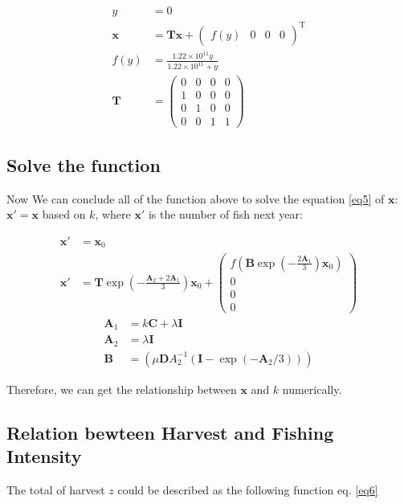 \documentclass{IEEEtran}
\begin{document}
\begin{align}
    \label{eq4}
    y &= 0\\
    \bm x &= \mathbf T \bm x +\begin{pmatrix} f(y)&0&0&0\end{pmatrix}^{\mathrm T}\\
    f(y) &= \frac{1.22\times 10 ^{11}y}{1.22\times 10 ^{11} + y}\\
    \mathbf T &= \begin{pmatrix} 0 & 0 & 0 & 0 \\ 1& 0 & 0 & 0 \\ 0 & 1 & 0 & 0 \\0 & 0 & 1 & 1 \end{pmatrix}
\end{align}

\subsection{Solve the function}

Now We can conclude all of the function above to solve the equation \ref{eq5} of $\bm x$: $\bm x' = \bm x$ based on $k$, where $\bm x'$ is the number of fish next year:  

\begin{align}
    \bm x' &= \bm x_0\\
    \label{eq5}
    \bm x' &= \mathbf T \exp(-\frac{\mathbf A_2 + 2 \mathbf A_1}{3})\bm x_0 +\begin{pmatrix} f(\mathbf B \exp(-\frac{2\mathbf A_1}{3})\bm x_0)\\0\\0\\0\end{pmatrix}
\end{align}
\begin{align}
    \mathbf A_1 &= k\mathbf C + \lambda \mathbf I\\
    \mathbf A_2 &= \lambda \mathbf I\\
    \mathbf B &= (\mu \mathbf D A_2^{-1}(\mathbf I - \exp(-\mathbf A_2/3)))
\end{align}

Therefore, we can get the relationship between $\bm x$ and $k$ numerically.
\subsection{Relation bewteen Harvest and Fishing Intensity}
The total of harvest $z$ could be described as the following function eq. \ref{eq6}
\end{document}
